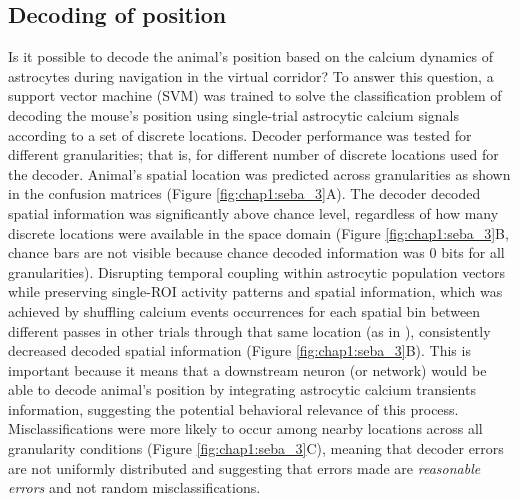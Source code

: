 \subsection{Decoding of position}
\label{chap1:sec:3:subsec3:position_decoding}
Is it possible to decode the animal's position based on the calcium dynamics of astrocytes during navigation in the virtual corridor? 
To answer this question, a support vector machine (SVM) was trained to solve the classification problem of decoding the mouse's position using single-trial astrocytic calcium signals according to a set of discrete locations.
Decoder performance was tested for different granularities; that is, for different number of discrete locations used for the decoder.
Animal’s spatial location was predicted across granularities as shown in the confusion matrices (Figure \ref{fig:chap1:seba_3}A).
The decoder decoded spatial information was significantly above chance level, regardless of how many discrete locations were available in the space domain (Figure \ref{fig:chap1:seba_3}B, chance bars are not visible because chance decoded information was 0 bits for all granularities).
Disrupting temporal coupling within astrocytic population vectors while preserving single-ROI activity patterns and spatial information, which was achieved by shuffling calcium events occurrences for each spatial bin between different passes in other trials through that same location (as in \cite{stefanini2020distributed}), consistently decreased decoded spatial information (Figure \ref{fig:chap1:seba_3}B).
This is important because it means that a downstream neuron (or network) would be able to decode animal's position by integrating astrocytic calcium transients information, suggesting the potential behavioral relevance of this process. 
Misclassifications were more likely to occur among nearby locations across all granularity conditions (Figure \ref{fig:chap1:seba_3}C), meaning that decoder errors are not uniformly distributed and suggesting that errors made are \textit{reasonable errors} and not random misclassifications.
